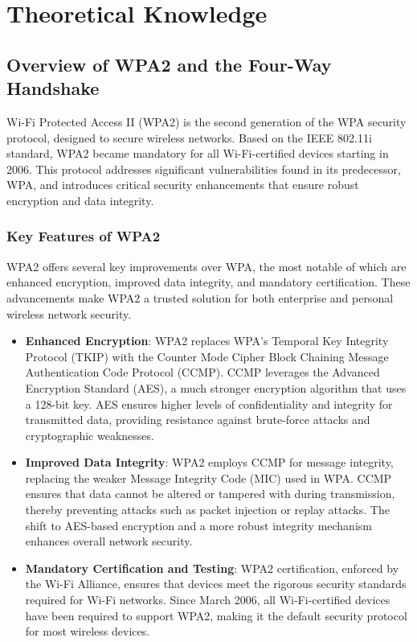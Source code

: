 \part{Theoretical Knowledge}
\chapter{Overview of WPA2 and the Four-Way Handshake}
Wi-Fi Protected Access II (WPA2) is the second generation of the WPA security protocol, designed to secure wireless networks. Based on the IEEE 802.11i standard, WPA2 became mandatory for all Wi-Fi-certified devices starting in 2006. This protocol addresses significant vulnerabilities found in its predecessor, WPA, and introduces critical security enhancements that ensure robust encryption and data integrity.

\section{Key Features of WPA2}
WPA2 offers several key improvements over WPA, the most notable of which are enhanced encryption, improved data integrity, and mandatory certification. These advancements make WPA2 a trusted solution for both enterprise and personal wireless network security.

\begin{itemize}
    \item \textbf{Enhanced Encryption}: WPA2 replaces WPA's Temporal Key Integrity Protocol (TKIP) with the Counter Mode Cipher Block Chaining Message Authentication Code Protocol (CCMP). CCMP leverages the Advanced Encryption Standard (AES), a much stronger encryption algorithm that uses a 128-bit key. AES ensures higher levels of confidentiality and integrity for transmitted data, providing resistance against brute-force attacks and cryptographic weaknesses.
    
    \item \textbf{Improved Data Integrity}: WPA2 employs CCMP for message integrity, replacing the weaker Message Integrity Code (MIC) used in WPA. CCMP ensures that data cannot be altered or tampered with during transmission, thereby preventing attacks such as packet injection or replay attacks. The shift to AES-based encryption and a more robust integrity mechanism enhances overall network security.
    
    \item \textbf{Mandatory Certification and Testing}: WPA2 certification, enforced by the Wi-Fi Alliance, ensures that devices meet the rigorous security standards required for Wi-Fi networks. Since March 2006, all Wi-Fi-certified devices have been required to support WPA2, making it the default security protocol for most wireless devices.
\end{itemize}

